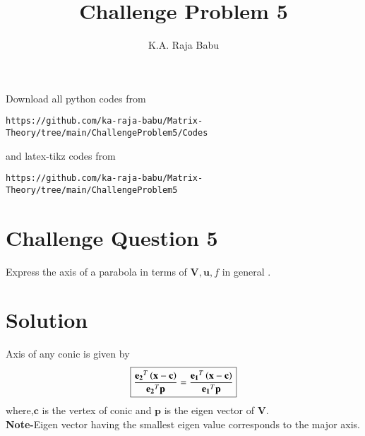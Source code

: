 \documentclass[journal,12pt,twocolumn]{IEEEtran}
\begin{document}
\makeatother
\let\StandardTheFigure\thefigure
\let\vec\mathbf
\renewcommand{\thefigure}{\theproblem}
\def\putbox#1#2#3{\makebox[0in][l]{\makebox[#1][l]{}\raisebox{\baselineskip}[0in][0in]{\raisebox{#2}[0in][0in]{#3}}}}
     \def\rightbox#1{\makebox[0in][r]{#1}}
     \def\centbox#1{\makebox[0in]{#1}}
     \def\topbox#1{\raisebox{-\baselineskip}[0in][0in]{#1}}
     \def\midbox#1{\raisebox{-0.5\baselineskip}[0in][0in]{#1}}
\vspace{3cm}
\title{Challenge Problem 5}
\author{K.A. Raja Babu}
\maketitle
\newpage
\bigskip
\renewcommand{\thefigure}{\theenumi}
\renewcommand{\thetable}{\theenumi}
Download all python codes from 
\begin{lstlisting}
https://github.com/ka-raja-babu/Matrix-Theory/tree/main/ChallengeProblem5/Codes
\end{lstlisting}
%
and latex-tikz codes from 
%
\begin{lstlisting}
https://github.com/ka-raja-babu/Matrix-Theory/tree/main/ChallengeProblem5
\end{lstlisting}
%
\section{Challenge Question 5}

Express the axis of a parabola in terms of $\vec{V},\vec{u},f$ in general .

\section{Solution}

\begin{lemma}
Axis of any conic is given by
\begin{align}
    \boxed{\frac{\vec{e_2}^T\brak{\vec{x}-\vec{c}}}{{\vec{e_2}^T\vec{p}}} = \frac{\vec{e_1}^T\brak{\vec{x}-\vec{c}}}{{\vec{e_1}^T\vec{p}}}}
\end{align}
where,$\vec{c}$ is the vertex of conic and $\vec{p}$ is the eigen vector of $\vec{V}$.\\
\textbf{Note-}Eigen vector having the smallest eigen value corresponds to the major axis.
\end{lemma}
\end{document}
